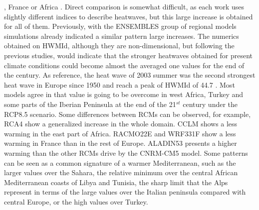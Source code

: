 \cite{lho_al2018},  France \cite{ouz_al2016} or Africa \cite{dos2017}. Direct
comparison is somewhat difficult,
as each work uses slightly different indices to describe heatwaves, but this large
increase is obtained for all of them. Previously, with the ENSEMBLES 
group of regional models simulations \cite{fis_sch2010} already indicated a similar 
pattern large increases. 
The numerics obtained on HWMId, although they are non-dimensional, but following the
previous studies, would indicate that the stronger heatwaves obtained for present
climate conditions could become almost the averaged one values for the end of the
century. 
As reference, the heat wave of 2003 summer was the second strongest heat wave in
Europe since 1950 \cite{bar_al2011} and reach a peak of HWMId of 44.7
\cite{rus_al2015}. Most models agree in that value is going to be overcome in west
Africa,  Turkey and some parts of the Iberian Peninsula at the end of the 21$^{st}$
century under the RCP8.5 scenario. 
Some differences between RCMs can be observed, for example, RCA4 show a generalized
increase in the whole domain. CCLM shows a less warming in the east part of Africa.
RACMO22E and WRF331F show a less warming in France than in the rest of Europe.
ALADIN53 presents a higher warming than the other RCMs drive by the CNRM-CM5 model. 
Some patterns can be seen as a common signature of a warmer Mediterranean,
such as the larger values over the Sahara, the relative minimum over the central
African Mediterranean coasts of Libya and Tunisia, the sharp limit that the Alps
represent in terms of the large values over the Italian peninsula compared with
central Europe, or the high values over Turkey. 

